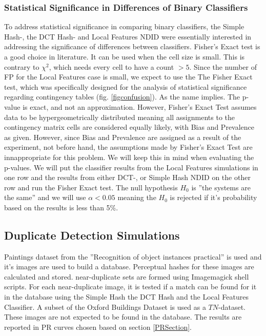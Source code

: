 \documentclass[english,12pt,a4paper,pdftex,elec,utf8, table]{aaltothesis}
\begin{document}
\subsubsection{Statistical Significance in Differences of Binary Classifiers}
To address statistical significance in comparing binary classifiers, the Simple Hash-, the DCT Hash- and Local Features NDID were essentially interested in addressing the significance of differences between classifiers. Fisher's Exact test is a good choice in literature. It can be used when the cell size is small. This is contrary to $\chi^2$, which needs every cell to have a count $>5$. Since the number of FP for the Local Features case is small, we expect to use the The Fisher Exact test, which was specifically designed for the analysis of statistical significance regarding contingency tables (fig. \ref{figconfusion}). As the name implies. The p-value is exact, and not an approximation. \cite{fisher1922interpretation}
However, Fisher's Exact Test assumes data to be hypergeometrically distributed meaning all assignments to the contingency matrix cells are considered equally likely, with Bias and Prevalence as given. However, since Bias and Prevalence are assigned as a result of the experiment, not before hand, the assumptions made by Fisher's Exact Test are innappropriate for this problem. We will keep this in mind when evaluating the p-values.
We will put the classifier results from the Local Features simulations in one row and the results from either DCT-, or Simple Hash NDID on the other row and run the Fisher Exact test. The null hypothesis $H_0$ is ''the systems are the same'' and we will use $\alpha < 0.05$ meaning the $H_0$ is rejected if it's probability based on the results is less than 5\%.

\subsection{Duplicate Detection Simulations}
Paintings dataset from the ''Recognition of object instances practical'' \cite{Vedaldi2012} is used and it's images are used to build a database. Perceptual hashes for these images are calculated and stored. near-duplicate sets are formed using Imagemagick shell scripts. For each near-duplicate image, it is tested if a match can be found for it in the database using the Simple Hash the DCT Hash and the Local Features Classifier. A subset of the Oxford Buildings Dataset \cite{PhilbinJamesArandjelovicReljaZisserman2012} is used as a $TN$-dataset. These images are not expected to be found in the database. The results are reported in PR curves chosen based on section \ref{PRSection}.
\end{document}
